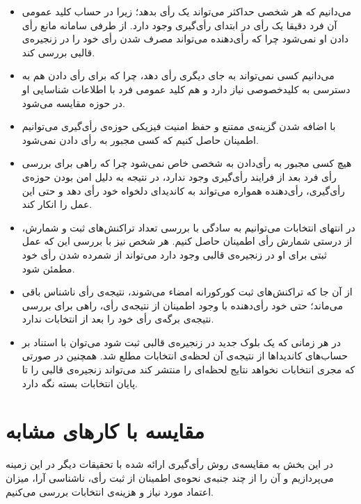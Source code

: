 \begin{itemize}
	\item 
	می‌دانیم که هر شخصی حداکثر می‌تواند یک رأی‌ بدهد؛ زیرا در حساب کلید عمومی آن فرد دقیقا یک رأی در ابتدای رأی‌گیری وجود دارد. از طرفی سامانه مانع رأی دادن او نمی‌شود چرا که رأی‌دهنده می‌تواند مصرف شدن رأی خود را در زنجیره‌ی قالبی بررسی کند.
	\item 
	می‌دانیم کسی نمی‌تواند به جای دیگری رأی دهد، چرا که برای رأی دادن هم به دسترسی به کلیدخصوصی نیاز دارد و هم کلید عمومی فرد با اطلاعات شناسایی او در حوزه مقایسه می‌شود.
	\item 
	با اضافه شدن گزینه‌ی ممتنع و حفظ امنیت فیزیکی حوزه‌ی رأی‌گیری می‌توانیم اطمینان حاصل کنیم که کسی مجبور به رأی‌ دادن نمی‌شود.
	\item 
 هیچ کسی مجبور به رأی‌دادن به شخصی خاص نمی‌شود چرا که راهی برای بررسی رأی‌ فرد بعد از فرایند رأی‌گیری وجود ندارد، در نتیجه به دلیل امن بودن حوزه‌ی رأی‌گیری، رأی‌دهنده همواره می‌تواند به کاندیدای دلخواه خود رأی‌ دهد و حتی این عمل را انکار کند.
	\item 
	در انتهای انتخابات می‌توانیم به سادگی با بررسی تعداد تراکنش‌های ثبت و شمارش، از درستی شمارش رأی اطمینان حاصل کنیم. هر شخص نیز با بررسی این که عمل ثبتی برای او در زنجیره‌ی قالبی وجود دارد می‌تواند از شمرده شدن رأی خود مطمئن شود.
	\item 
	از آن جا که تراکنش‌های ثبت کورکورانه امضاء می‌شوند، نتیجه‌ی رأی ناشناس باقی می‌ماند؛ حتی خود رأی‌دهنده با وجود اطمینان از نتیجه‌ی رأی، راهی برای بررسی نتیجه‌ی برگه‌ی رأی خود را بعد از انتخابات ندارد.
	\item 
	در هر زمانی که یک بلوک جدید در زنجیره‌ی قالبی ثبت شود می‌توان با استناد بر حساب‌های کاندیداها از نتیجه‌ی آن لحظه‌ی انتخابات مطلع شد. همچنین در صورتی که مجری انتخابات نخواهد نتایج لحظه‌ای را منتشر کند می‌تواند زنجیره‌ی قالبی را تا پایان انتخابات بسته نگه دارد. 
\end{itemize}




\section{مقایسه با کارهای مشابه}
در این بخش به مقایسه‌‌ی روش رأی‌گیری ارائه شده با تحقیقات دیگر در این زمینه می‌پردازیم و آن را از چند جنبه‌ی نحوه‌ی اطمینان از ثبت رأی، ناشناسی آرا،  میزان اعتماد مورد نیاز و  هزینه‌ی انتخابات بررسی می‌کنیم. 
